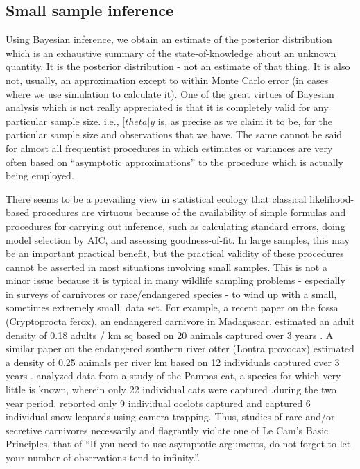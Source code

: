 \subsection{Small sample inference}
Using Bayesian inference, we obtain an estimate of the posterior distribution which is an exhaustive summary of the state-of-knowledge about an unknown quantity. It is the posterior distribution - not an estimate of that thing. It is also not, usually, an approximation except to within Monte Carlo error (in cases where we use simulation to calculate it).  One of the great virtues of Bayesian analysis which is not really appreciated is that it is completely valid for any particular sample size. i.e., $[theta|y$ is, as precise as we claim it to be, for the particular sample size and observations that we have.  The same cannot be said for almost all frequentist procedures in which estimates or variances are very often based on ``asymptotic approximations'' to the procedure which is actually being employed.  

There seems to be a prevailing view in statistical ecology that classical likelihood-based procedures are virtuous because of the availability of simple formulas and procedures for carrying out inference, such as calculating standard errors, doing model selection by AIC, and assessing goodness-of-fit.  In large samples, this may be an important practical benefit, but the practical validity of these procedures cannot be asserted in most situations involving small samples.  This is not a minor issue because it is typical in many wildlife sampling problems - especially in surveys of carnivores or rare/endangered species - to wind up with a small, sometimes extremely small, data set. For example, a recent paper on the fossa (Cryptoprocta ferox), an endangered carnivore in Madagascar, estimated an adult density of 0.18 adults / km sq based on 20 animals captured over 3 years \citep{hawkins_racey:2005}. A similar paper on the endangered southern river otter (Lontra provocax) estimated a density of 0.25 animals per river km based on 12 individuals captured over 3 years \citep{sepulveda_etal:2007}. \citet{gardner_etal:2010} analyzed data from a study of the Pampas cat, a species for which very little is known, wherein only 22 individual cats were captured .during the two year period.  \citet{trolle_kery:2005} reported only 9 individual ocelots captured and \citet{jackson_etal:2006} captured 6 individual snow leopards using camera trapping. Thus, studies of rare and/or secretive carnivores necessarily and flagrantly violate one of Le Cam's Basic Principles, that of ``If you need to use asymptotic arguments, do not forget to let your number of observations tend to infinity.''\citep{lecam:1990}.

